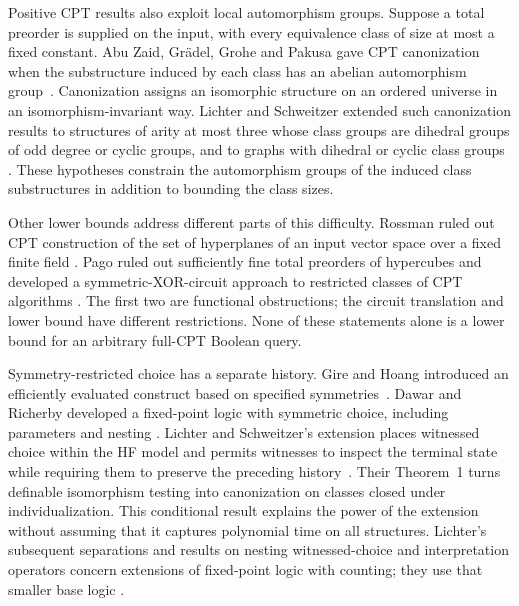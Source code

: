 Positive CPT results also exploit local automorphism groups. Suppose a
total preorder is supplied on the input, with every equivalence class of
size at most a fixed constant. Abu Zaid, Gr{\"a}del, Grohe and Pakusa gave
CPT canonization when the substructure induced by each class has an
abelian automorphism group~\cite[Definition~15 and Corollary~19]{abuZaid2014}.
Canonization assigns an isomorphic structure on an ordered universe in an
isomorphism-invariant way. Lichter and Schweitzer extended such
canonization results to structures of arity at most three whose class groups
are dihedral groups of odd degree or cyclic groups, and to graphs with
dihedral or cyclic class groups
\cite[Theorem~1]{lichterSchweitzer2021}.
These hypotheses constrain the automorphism groups of the induced class
substructures in addition to bounding the class sizes.

Other lower bounds address different parts of this difficulty. Rossman
ruled out CPT construction of the set of hyperplanes of an input vector
space over a fixed finite field
\cite[Theorem~6.1, author version]{rossman2010}.
Pago ruled out sufficiently fine total preorders of hypercubes
\cite[Theorem~2 and Corollary~3, full version]{pago2021} and developed
a symmetric-XOR-circuit approach to restricted classes of CPT algorithms
\cite[Theorems~1--2, full version]{pago2023}.
The first two are functional obstructions; the circuit translation and
lower bound have different restrictions. None of these statements alone
is a lower bound for an arbitrary full-CPT Boolean query.

Symmetry-restricted choice has a separate history. Gire and Hoang
introduced an efficiently evaluated construct based on specified
symmetries~\cite{gireHoang1998}. Dawar and Richerby developed a fixed-point
logic with symmetric choice, including parameters and nesting
\cite{dawarRicherby2003}. Lichter and Schweitzer's extension places
witnessed choice within the HF model and permits witnesses to inspect
the terminal state while requiring them to preserve the preceding
history~\cite{ls2023}. Their Theorem~1 turns definable isomorphism testing
into canonization on classes closed under individualization. This
conditional result explains the power of the extension without assuming
that it captures polynomial time on all structures.
Lichter's subsequent separations and results on nesting witnessed-choice
and interpretation operators concern extensions of fixed-point logic
with counting; they use that smaller base logic
\cite[Theorems~1 and~3, version~8]{lichter2026}.

